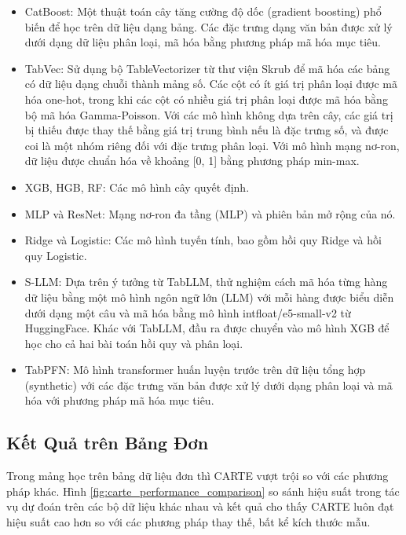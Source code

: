 \documentclass{article}
\begin{document}
\begin{itemize}
    \item CatBoost: Một thuật toán cây tăng cường độ dốc (gradient boosting) phổ biến để học trên dữ liệu dạng bảng. Các đặc trưng dạng văn bản được xử lý dưới dạng dữ liệu phân loại, mã hóa bằng phương pháp mã hóa mục tiêu.
    \item TabVec: Sử dụng bộ TableVectorizer từ thư viện Skrub để mã hóa các bảng có dữ liệu dạng chuỗi thành mảng số. Các cột có ít giá trị phân loại được mã hóa one-hot, trong khi các cột có nhiều giá trị phân loại được mã hóa bằng bộ mã hóa Gamma-Poisson. Với các mô hình không dựa trên cây, các giá trị bị thiếu được thay thế bằng giá trị trung bình nếu là đặc trưng số, và được coi là một nhóm riêng đối với đặc trưng phân loại. Với mô hình mạng nơ-ron, dữ liệu được chuẩn hóa về khoảng [0, 1] bằng phương pháp min-max.
    \item XGB, HGB, RF: Các mô hình cây quyết định.
    \item MLP và ResNet: Mạng nơ-ron đa tầng (MLP) và phiên bản mở rộng của nó.
    \item Ridge và Logistic: Các mô hình tuyến tính, bao gồm hồi quy Ridge và hồi quy Logistic.
    \item S-LLM: Dựa trên ý tưởng từ TabLLM, thử nghiệm cách mã hóa từng hàng dữ liệu bằng một mô hình ngôn ngữ lớn (LLM) với mỗi hàng được biểu diễn dưới dạng một câu và mã hóa bằng mô hình intfloat/e5-small-v2 từ HuggingFace. Khác với TabLLM, đầu ra được chuyển vào mô hình XGB để học cho cả hai bài toán hồi quy và phân loại. 
    \item TabPFN: Mô hình transformer huấn luyện trước trên dữ liệu tổng hợp (synthetic) với các đặc trưng văn bản được xử lý dưới dạng phân loại và mã hóa với phương pháp mã hóa mục tiêu.
\end{itemize}


\subsection{Kết Quả trên Bảng Đơn} 
Trong mảng học trên bảng dữ liệu đơn thì CARTE vượt trội so với các phương pháp khác. Hình \ref{fig:carte_performance_comparison} so sánh hiệu suất trong tác vụ dự đoán trên các bộ dữ liệu khác nhau và kết quả cho thấy CARTE luôn đạt hiệu suất cao hơn so với các phương pháp thay thế, bất kể kích thước mẫu.
\end{document}
